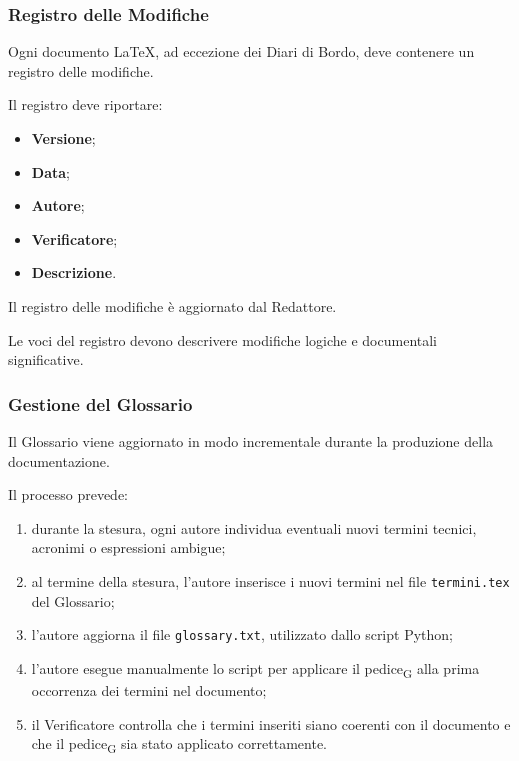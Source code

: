 
\subsubsection{Registro delle Modifiche}

Ogni documento \LaTeX{}, ad eccezione dei Diari di Bordo, deve contenere un registro
delle modifiche.

Il registro deve riportare:

\begin{itemize}
    \item \textbf{Versione};
    \item \textbf{Data};
    \item \textbf{Autore};
    \item \textbf{Verificatore};
    \item \textbf{Descrizione}.
\end{itemize}

Il registro delle modifiche è aggiornato dal Redattore.

Le voci del registro devono descrivere modifiche logiche e documentali significative.


\subsubsection{Gestione del Glossario}

Il Glossario viene aggiornato in modo incrementale durante la produzione della
documentazione.

Il processo prevede:

\begin{enumerate}
    \item durante la stesura, ogni autore individua eventuali nuovi termini tecnici,
    acronimi o espressioni ambigue;

    \item al termine della stesura, l'autore inserisce i nuovi termini nel file
    \texttt{termini.tex} del Glossario;

    \item l'autore aggiorna il file \texttt{glossary.txt}, utilizzato dallo script
    Python;

    \item l'autore esegue manualmente lo script per applicare il pedice\textsubscript{G}
     alla prima occorrenza dei termini nel documento;

    \item il Verificatore controlla che i termini inseriti siano coerenti con il
    documento e che il pedice\textsubscript{G} sia stato applicato correttamente.
\end{enumerate}

